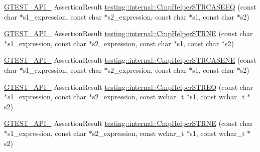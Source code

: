 \begin{DoxyCompactItemize}
\item 
\mbox{\hyperlink{_obj__test_2lib_2googletest-release-1_88_81_2googletest_2include_2gtest_2internal_2gtest-port_8h_aa73be6f0ba4a7456180a94904ce17790}{G\+T\+E\+S\+T\+\_\+\+A\+P\+I\+\_\+}} Assertion\+Result \mbox{\hyperlink{namespacetesting_1_1internal_a30dfeb01f1bc8087c7d05205d5fa75c1}{testing\+::internal\+::\+Cmp\+Helper\+S\+T\+R\+C\+A\+S\+E\+EQ}} (const char $\ast$s1\+\_\+expression, const char $\ast$s2\+\_\+expression, const char $\ast$s1, const char $\ast$s2)
\item 
\mbox{\hyperlink{_obj__test_2lib_2googletest-release-1_88_81_2googletest_2include_2gtest_2internal_2gtest-port_8h_aa73be6f0ba4a7456180a94904ce17790}{G\+T\+E\+S\+T\+\_\+\+A\+P\+I\+\_\+}} Assertion\+Result \mbox{\hyperlink{namespacetesting_1_1internal_af2d31c77ce73e1003a64bd7ca3564bbe}{testing\+::internal\+::\+Cmp\+Helper\+S\+T\+R\+NE}} (const char $\ast$s1\+\_\+expression, const char $\ast$s2\+\_\+expression, const char $\ast$s1, const char $\ast$s2)
\item 
\mbox{\hyperlink{_obj__test_2lib_2googletest-release-1_88_81_2googletest_2include_2gtest_2internal_2gtest-port_8h_aa73be6f0ba4a7456180a94904ce17790}{G\+T\+E\+S\+T\+\_\+\+A\+P\+I\+\_\+}} Assertion\+Result \mbox{\hyperlink{namespacetesting_1_1internal_a7e31d489f06ab8f6a81a7729f0c377e7}{testing\+::internal\+::\+Cmp\+Helper\+S\+T\+R\+C\+A\+S\+E\+NE}} (const char $\ast$s1\+\_\+expression, const char $\ast$s2\+\_\+expression, const char $\ast$s1, const char $\ast$s2)
\item 
\mbox{\hyperlink{_obj__test_2lib_2googletest-release-1_88_81_2googletest_2include_2gtest_2internal_2gtest-port_8h_aa73be6f0ba4a7456180a94904ce17790}{G\+T\+E\+S\+T\+\_\+\+A\+P\+I\+\_\+}} Assertion\+Result \mbox{\hyperlink{namespacetesting_1_1internal_ad351878f87634853c4eb005fe9b169a8}{testing\+::internal\+::\+Cmp\+Helper\+S\+T\+R\+EQ}} (const char $\ast$s1\+\_\+expression, const char $\ast$s2\+\_\+expression, const wchar\+\_\+t $\ast$s1, const wchar\+\_\+t $\ast$s2)
\item 
\mbox{\hyperlink{_obj__test_2lib_2googletest-release-1_88_81_2googletest_2include_2gtest_2internal_2gtest-port_8h_aa73be6f0ba4a7456180a94904ce17790}{G\+T\+E\+S\+T\+\_\+\+A\+P\+I\+\_\+}} Assertion\+Result \mbox{\hyperlink{namespacetesting_1_1internal_a415a953647bbc9469f062dc966061efb}{testing\+::internal\+::\+Cmp\+Helper\+S\+T\+R\+NE}} (const char $\ast$s1\+\_\+expression, const char $\ast$s2\+\_\+expression, const wchar\+\_\+t $\ast$s1, const wchar\+\_\+t $\ast$s2)
\item 

\end{DoxyCompactItemize}
